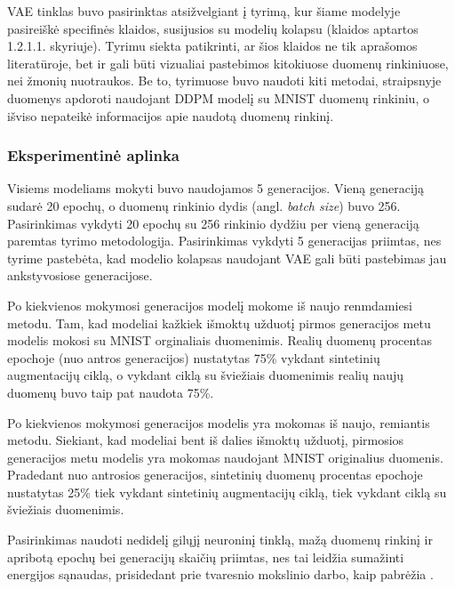 \documentclass{VUMIFInfKursinis}
\begin{document}
VAE tinklas buvo pasirinktas atsižvelgiant į \cite{AICollapseNature} tyrimą, kur šiame modelyje pasireiškė specifinės klaidos, susijusios su modelių kolapsu (klaidos aptartos 1.2.1.1. skyriuje). Tyrimu siekta patikrinti, ar šios klaidos ne tik aprašomos literatūroje, bet ir gali būti vizualiai pastebimos kitokiuose duomenų rinkiniuose, nei žmonių nuotraukos. Be to, tyrimuose buvo naudoti kiti metodai, \cite{ModelsGoMAD} straipsnyje duomenys apdoroti naudojant DDPM modelį su MNIST duomenų rinkiniu, o \cite{AICollapseNature} išviso nepateikė informacijos apie naudotą duomenų rinkinį.

\subsubsection{Eksperimentinė aplinka}

Visiems modeliams mokyti buvo naudojamos 5 generacijos. Vieną generaciją sudarė 20 epochų, o duomenų rinkinio dydis (angl. \textsl{batch size}) buvo 256. Pasirinkimas vykdyti 20 epochų su 256 rinkinio dydžiu per vieną generaciją paremtas \cite{ModelsGoMAD} tyrimo metodologija. Pasirinkimas vykdyti 5 generacijas priimtas, nes tyrime \cite{AICollapseNature} pastebėta, kad modelio kolapsas naudojant VAE gali būti pastebimas jau ankstyvosiose generacijose.

Po kiekvienos mokymosi generacijos modelį mokome iš naujo renmdamiesi \cite{ModelsGoMAD} metodu. Tam, kad modeliai kažkiek išmoktų užduotį pirmos generacijos metu modelis mokosi su MNIST orginaliais duomenimis. Realių duomenų procentas epochoje (nuo antros generacijos) nustatytas 75\% vykdant sintetinių augmentacijų ciklą, o vykdant ciklą su šviežiais duomenimis realių naujų duomenų buvo taip pat naudota 75\%.

Po kiekvienos mokymosi generacijos modelis yra mokomas iš naujo, remiantis \cite{ModelsGoMAD} metodu. Siekiant, kad modeliai bent iš dalies išmoktų užduotį, pirmosios generacijos metu modelis yra mokomas naudojant MNIST originalius duomenis. Pradedant nuo antrosios generacijos, sintetinių duomenų procentas epochoje nustatytas 25\% tiek vykdant sintetinių augmentacijų ciklą, tiek vykdant ciklą su šviežiais duomenimis.

Pasirinkimas naudoti nedidelį gilųjį neuroninį tinklą, mažą duomenų rinkinį ir apribotą epochų bei generacijų skaičių priimtas, nes tai leidžia sumažinti energijos sąnaudas, prisidedant prie tvaresnio mokslinio darbo, kaip pabrėžia \cite{energy_2019}. 
\end{document}

